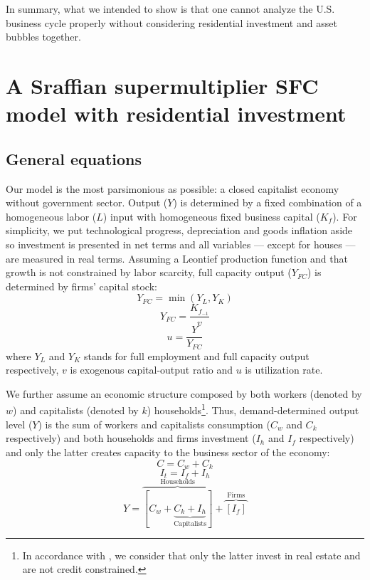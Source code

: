 \documentclass[11pt]{article}
\begin{document}
In summary, what we intended to show is that one cannot analyze the U.S. business cycle properly without considering residential investment and asset bubbles together.


\section{A Sraffian supermultiplier SFC model with residential investment}
\label{sec:orgc0664b2}
\label{sec:Model}
\subsection{General equations}
\label{sec:org59b3880}

Our model is the most parsimonious as possible: a closed capitalist economy without government sector. Output (\(Y\)) is determined by  a fixed combination of a homogeneous labor (\(L\)) input with homogeneous fixed business capital (\(K_f\)). 
For simplicity, we put technological progress, depreciation and goods inflation aside so investment is presented in net terms and all variables --- except for houses --- are measured in real terms.
Assuming a Leontief production function and that growth is not constrained by labor scarcity, full capacity output (\(Y_{FC}\)) is
determined by firms' capital stock:
\begin{equation}
\label{_Leontieff}
    Y_{FC} = \min (Y_L, Y_K)
\end{equation}
\begin{equation}
\label{_YFC}
    Y_{FC} = \frac{K_{f_{-1}}}{v}
\end{equation}
\begin{equation}
\label{_u}
    u = \frac{Y}{Y_{FC}}
\end{equation}
where \(Y_L\) and \(Y_K\) stands for full employment and full capacity output respectively, \(v\) is exogenous capital-output ratio and \(u\) is utilization rate.

We further assume an economic structure composed by both workers (denoted by \(w\)) and capitalists (denoted by \(k\)) households\footnote{In accordance with \textcite{albanesi_credit_2017}, we consider that only the latter invest in real estate and are not credit constrained.}.
Thus, demand-determined output level (\(Y\))  is the sum of workers and capitalists consumption (\(C_w\) and \(C_k\) respectively) and both households and firms investment (\(I_h\) and \(I_f\) respectively) and only the latter creates capacity to the business sector of the economy:
\begin{equation}
\label{_Ct}
    C = C_w + C_k
\end{equation}
\begin{equation}
\label{_It}
    I_t = I_f + I_h
\end{equation}
\begin{equation}
\label{_Y}
    Y = \overbrace{[C_w + \underbrace{C_k + I_h}_{\text{Capitalists}}]}^{\text{Households}} + \overbrace{[I_f]}^{\text{Firms}}
\end{equation}
\end{document}
